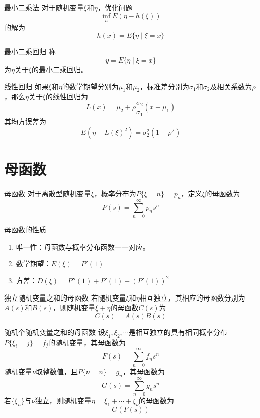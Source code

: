 \documentclass[lang = cn, scheme = chinese, thmcnt = section]{elegantbook}
\begin{document}
\begin{definition}{最小二乘法}
	对于随机变量$\xi$和$\eta$，优化问题
	$$
	\inf_{h}E(\eta-h(\xi))
	$$
	的解为
	$$
	h(x)=E\{\eta \mid \xi=x\}
	$$
\end{definition}

\begin{definition}{最小二乘回归}
	称
	$$
	y=E\{\eta \mid \xi=x\}
	$$
	为$\eta$关于$\xi$的最小二乘回归。
\end{definition}

\begin{definition}{线性回归}
	如果$\xi$和$\eta$的数学期望分别为$\mu_1$和$\mu_2$，标准差分别为$\sigma_1$和$\sigma_2$及相关系数为$\rho$，那么$\eta$关于$\xi$的线性回归为
	$$
	L(x)=\mu_2+\rho\frac{\sigma_2}{\sigma_1}(x-\mu_1)
	$$
	其均方误差为
	$$
	E(\eta-L(\xi)^2)=\sigma_2^2(1-\rho^2)
	$$
\end{definition}

\section{母函数}

\begin{definition}{母函数}
	对于离散型随机变量$\xi$，概率分布为$P\{\xi=n\}=p_n$，定义$\xi$的母函数为
	$$
	P(s)=\sum_{n=0}^{\infty}{p_n s^n}
	$$
\end{definition}

\begin{proposition}{母函数的性质}
	\begin{enumerate}
		\item 唯一性：母函数与概率分布函数一一对应。
		\item 数学期望：$E(\xi)=P'(1)$
		\item 方差：$D(\xi)=P''(1)+P'(1)-(P'(1))^2$
	\end{enumerate}
\end{proposition}

\begin{proposition}{独立随机变量之和的母函数}
	若随机变量$\xi$和$\eta$相互独立，其相应的母函数分别为$A(s)$和$B(s)$，则随机变量$\xi+\eta$的母函数$C(s)$为
	$$
	C(s)=A(s)B(s)
	$$
\end{proposition}

\begin{proposition}{随机个随机变量之和的母函数}
	设$\xi_1,\xi_2,\cdots$是相互独立的具有相同概率分布$P\{\xi_i=j\}=f_j$的随机变量，其母函数为
	$$
	F(s)=\sum_{n=0}^{\infty}{f_n s^n}
	$$
	随机变量$\nu$取整数值，且$P\{\nu=n\}=g_n$，其母函数为
	$$
	G(s)=\sum_{n=0}^{\infty}{g_n s^n}
	$$
	若$\{\xi_n\}$与$\nu$独立，则随机变量$\eta=\xi_1+\cdots+\xi_{\nu}$的母函数为
	$$
	G(F(s))
	$$
\end{proposition}
\end{document}
